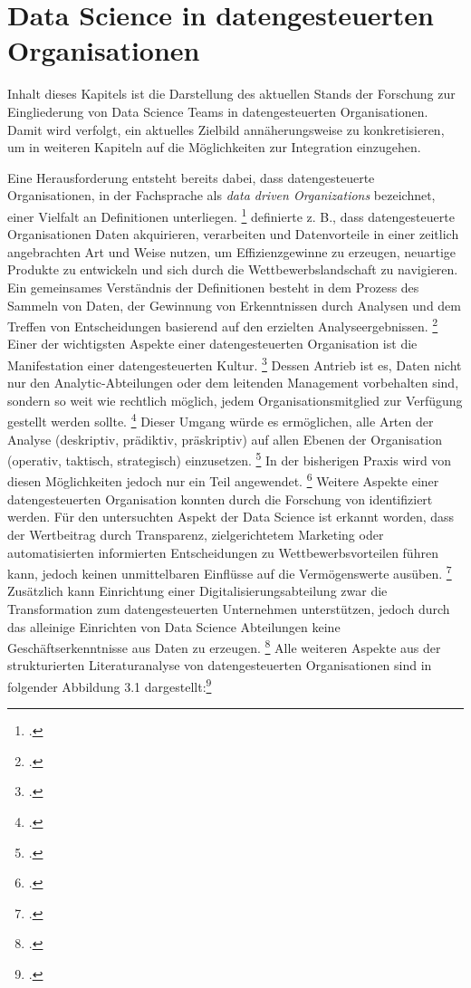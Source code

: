 \chapter{Data Science in datengesteuerten Organisationen}

Inhalt dieses Kapitels ist die Darstellung des aktuellen Stands der Forschung zur Eingliederung von Data Science Teams in datengesteuerten Organisationen.
Damit wird verfolgt, ein aktuelles Zielbild annäherungsweise zu konkretisieren, um in weiteren Kapiteln auf die Möglichkeiten zur Integration einzugehen.

Eine Herausforderung entsteht bereits dabei, dass datengesteuerte Organisationen, in der Fachsprache als \textit{data driven Organizations} bezeichnet, einer Vielfalt an Definitionen unterliegen. \footcite[Vgl.][S. 4]{Dalpiaz.2020}
 definierte z. B., dass datengesteuerte Organisationen Daten akquirieren, verarbeiten und Datenvorteile in einer zeitlich angebrachten Art und Weise nutzen, um Effizienzgewinne zu erzeugen, neuartige Produkte zu entwickeln und sich durch die Wettbewerbslandschaft zu navigieren. %
Ein gemeinsames Verständnis der Definitionen besteht in dem Prozess des Sammeln von Daten, der Gewinnung von Erkenntnissen durch Analysen und dem Treffen von Entscheidungen basierend auf den erzielten Analyseergebnissen. \footcite[Vgl.][S. 4]{Dalpiaz.2020}
Einer der wichtigsten Aspekte einer datengesteuerten Organisation ist die Manifestation einer datengesteuerten Kultur. \footcite[Vgl.][S. 15]{Dalpiaz.2020}
Dessen Antrieb ist es, Daten nicht nur den Analytic-Abteilungen oder dem leitenden Management vorbehalten sind, sondern so weit wie rechtlich möglich, jedem Organisationsmitglied zur Verfügung gestellt werden sollte. \footcite[Vgl.][S. 6]{Patil.2011}
Dieser Umgang würde es ermöglichen, alle Arten der Analyse (deskriptiv, prädiktiv, präskriptiv) auf allen Ebenen der Organisation (operativ, taktisch, strategisch) einzusetzen. \footcite[Vgl.][S. 4]{Dalpiaz.2020}
In der bisherigen Praxis wird von diesen Möglichkeiten jedoch nur ein Teil angewendet. \footcite[Vgl.][S. 4]{Dalpiaz.2020}
Weitere Aspekte einer datengesteuerten Organisation konnten durch die Forschung von  identifiziert werden.
Für den untersuchten Aspekt der Data Science ist erkannt worden, dass der Wertbeitrag durch Transparenz, zielgerichtetem Marketing oder automatisierten informierten Entscheidungen zu Wettbewerbsvorteilen führen kann, jedoch keinen unmittelbaren Einflüsse auf die Vermögenswerte ausüben. \footcite[Vgl.][S. 5]{MariusHupperz.2021}
Zusätzlich kann Einrichtung einer Digitalisierungsabteilung zwar die Transformation zum datengesteuerten Unternehmen unterstützen, jedoch durch das alleinige Einrichten von Data Science Abteilungen keine Geschäftserkenntnisse aus Daten zu erzeugen. \footcite[Vgl.][S. 5]{MariusHupperz.2021}
Alle weiteren Aspekte aus der strukturierten Literaturanalyse von datengesteuerten Organisationen sind in folgender Abbildung 3.1 dargestellt:\footcite[Vgl.][S. 4]{MariusHupperz.2021}


